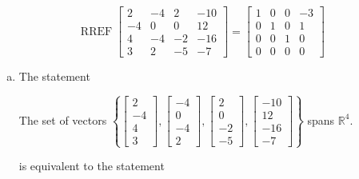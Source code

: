 \begin{exerciseAnswer} 


\[\operatorname{RREF} \left[\begin{array}{cccc}
2 & -4 & 2 & -10 \\
-4 & 0 & 0 & 12 \\
4 & -4 & -2 & -16 \\
3 & 2 & -5 & -7
\end{array}\right] = \left[\begin{array}{cccc}
1 & 0 & 0 & -3 \\
0 & 1 & 0 & 1 \\
0 & 0 & 1 & 0 \\
0 & 0 & 0 & 0
\end{array}\right] \]


\begin{enumerate}[(a)]
\item The statement 
\begin{center}\begin{minipage}{0.8\textwidth}
 The set of vectors \( \left\{ \left[\begin{array}{c}
2 \\
-4 \\
4 \\
3
\end{array}\right] , \left[\begin{array}{c}
-4 \\
0 \\
-4 \\
2
\end{array}\right] , \left[\begin{array}{c}
2 \\
0 \\
-2 \\
-5
\end{array}\right] , \left[\begin{array}{c}
-10 \\
12 \\
-16 \\
-7
\end{array}\right] \right\} \) spans \(\mathbb{R}^4\). 
\end{minipage}\end{center}
     is equivalent to the statement 
\begin{center}\begin{minipage}{0.8\textwidth}
 The vector equation \( x_{1} \left[\begin{array}{c}
2 \\
-4 \\

\end{array}
\end{minipage}
\end{center}
\end{enumerate}
\end{exerciseAnswer}
